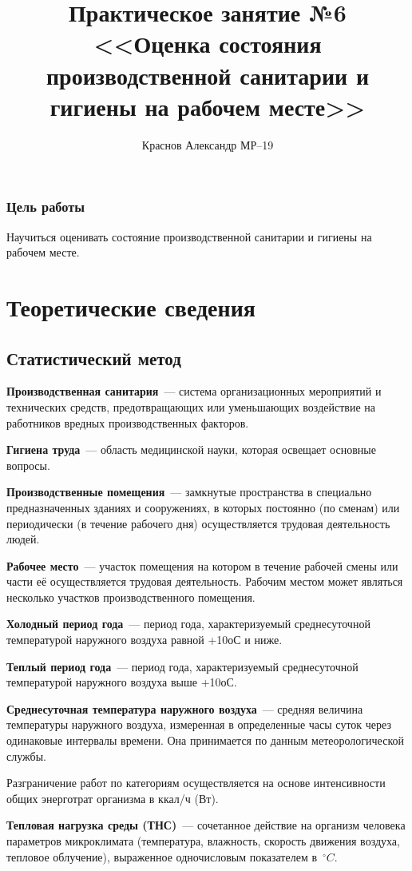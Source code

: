 \documentclass[a5paper, 12dd, twoside]{article}
\title{Практическое занятие №6\\<<Оценка состояния производственной санитарии и гигиены на рабочем месте>>}
\author{Краснов Александр МР--19}
\begin{document}
\maketitle
\tableofcontents
\clearpage

\subsubsection*{Цель работы}
Научиться оценивать состояние производственной санитарии и гигиены на рабочем месте.
\section{Теоретические сведения}
\subsection*{Статистический метод}
{\bfseries Производственная санитария}~--- система организационных мероприятий и технических средств, предотвращающих или уменьшающих воздействие на работников вредных производственных факторов.

{\bfseries Гигиена труда}~--- область медицинской науки, которая освещает основные вопросы.

{\bfseries Производственные помещения}~--- замкнутые пространства в специально предназначенных зданиях и сооружениях, в которых постоянно (по сменам) или периодически (в течение рабочего дня) осуществляется трудовая деятельность людей.

{\bfseries Рабочее место}~--- участок помещения на котором в течение рабочей смены или части её осуществляется трудовая деятельность. Рабочим местом может являться несколько участков производственного помещения.

{\bfseries Холодный период года}~--- период года, характеризуемый среднесуточной температурой наружного воздуха равной +10оС и ниже.

{\bfseries Теплый период года}~--- период года, характеризуемый среднесуточной температурой наружного воздуха выше +10оС.

{\bfseries Среднесуточная температура наружного воздуха}~--- средняя величина температуры наружного воздуха, измеренная в определенные часы суток через одинаковые интервалы времени. Она принимается по данным метеорологической службы.

Разграничение работ по категориям осуществляется на основе интенсивности общих энерготрат организма в ккал/ч (Вт).

{\bfseries Тепловая нагрузка среды (ТНС)}~--- сочетанное действие на организм человека параметров микроклимата (температура, влажность, скорость движения воздуха, тепловое облучение), выраженное одночисловым показателем в \(^\circ C\).
\end{document}
